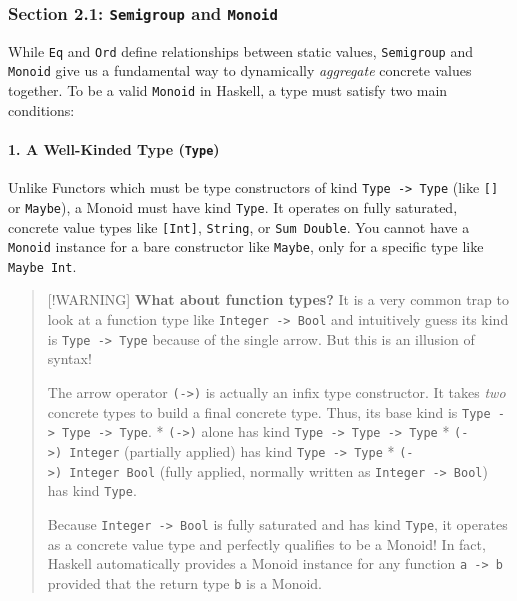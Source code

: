 \documentclass[
]{article}
\begin{document}
\subsubsection{\texorpdfstring{Section 2.1: \texttt{Semigroup} and
\texttt{Monoid}}{Section 2.1: Semigroup and Monoid}}\label{section-2.1-semigroup-and-monoid}

While \texttt{Eq} and \texttt{Ord} define relationships between static
values, \texttt{Semigroup} and \texttt{Monoid} give us a fundamental way
to dynamically \emph{aggregate} concrete values together. To be a valid
\texttt{Monoid} in Haskell, a type must satisfy two main conditions:

\paragraph{\texorpdfstring{1. A Well-Kinded Type
(\texttt{Type})}{1. A Well-Kinded Type (Type)}}\label{a-well-kinded-type-type}

Unlike Functors which must be type constructors of kind
\texttt{Type\ -\textgreater{}\ Type} (like \texttt{{[}{]}} or
\texttt{Maybe}), a Monoid must have kind \texttt{Type}. It operates on
fully saturated, concrete value types like \texttt{{[}Int{]}},
\texttt{String}, or \texttt{Sum\ Double}. You cannot have a
\texttt{Monoid} instance for a bare constructor like \texttt{Maybe},
only for a specific type like \texttt{Maybe\ Int}.

\begin{quote}
{[}!WARNING{]} \textbf{What about function types?} It is a very common
trap to look at a function type like
\texttt{Integer\ -\textgreater{}\ Bool} and intuitively guess its kind
is \texttt{Type\ -\textgreater{}\ Type} because of the single arrow. But
this is an illusion of syntax!

The arrow operator \texttt{(-\textgreater{})} is actually an infix type
constructor. It takes \emph{two} concrete types to build a final
concrete type. Thus, its base kind is
\texttt{Type\ -\textgreater{}\ Type\ -\textgreater{}\ Type}. *
\texttt{(-\textgreater{})} alone has kind
\texttt{Type\ -\textgreater{}\ Type\ -\textgreater{}\ Type} *
\texttt{(-\textgreater{})\ Integer} (partially applied) has kind
\texttt{Type\ -\textgreater{}\ Type} *
\texttt{(-\textgreater{})\ Integer\ Bool} (fully applied, normally
written as \texttt{Integer\ -\textgreater{}\ Bool}) has kind
\texttt{Type}.

Because \texttt{Integer\ -\textgreater{}\ Bool} is fully saturated and
has kind \texttt{Type}, it operates as a concrete value type and
perfectly qualifies to be a Monoid! In fact, Haskell automatically
provides a Monoid instance for any function
\texttt{a\ -\textgreater{}\ b} provided that the return type \texttt{b}
is a Monoid.
\end{quote}
\end{document}
